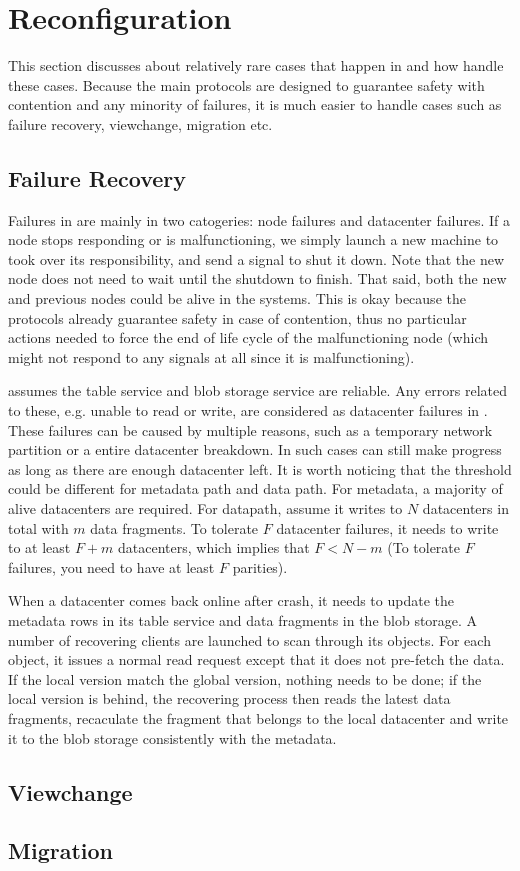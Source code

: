 \section{Reconfiguration}
This section discusses about relatively rare cases that happen in {\name}
and how {\name} handle these cases. Because the main protocols are designed
to guarantee safety with contention and any minority of failures, it is much
easier to handle cases such as failure recovery, viewchange, migration etc.

\subsection{Failure Recovery}

Failures in {\name} are mainly in two catogeries: {\name} node failures and
datacenter failures. If a {\name} node stops responding or is malfunctioning,
we simply launch a new machine to took over its responsibility, and send a
signal to shut it down. Note that the new node does not need to wait until
the shutdown to finish. That said, both the new and previous nodes could be
alive in the systems. This is okay because the {\name} protocols already
guarantee safety in case of contention, thus no particular actions needed
to force the end of life cycle of the malfunctioning node (which might not
respond to any signals at all since it is malfunctioning).

{\name} assumes the table service and blob storage service are reliable.
Any errors related to these, e.g. unable to read or write, are considered
as datacenter failures in {\name}. These failures can be caused by multiple
reasons, such as a temporary network partition or a entire datacenter breakdown.
In such cases {\name} can still make progress as long as there are enough
datacenter left. It is worth noticing that the threshold could be different for
metadata path and data path. For metadata, a majority of alive datacenters
are required. For datapath, assume it writes to $N$ datacenters in total with
$m$ data fragments. To tolerate $F$ datacenter failures, it needs to write
to at least $F+m$ datacenters, which implies that $F<N-m$ (To tolerate $F$
failures, you need to have at least $F$ parities).

When a datacenter comes back online after crash, it needs to update the
metadata rows in its table service and data fragments in the blob storage.
A number of recovering clients are launched to scan through its objects.
For each object, it issues a normal read request except that it does not
pre-fetch the data. If the local version match the global version, nothing
needs to be done; if the local version is behind, the recovering process
then reads the latest data fragments, recaculate the fragment that belongs
to the local datacenter and write it to the blob storage consistently with
the metadata.

\subsection{Viewchange}

\subsection{Migration}
